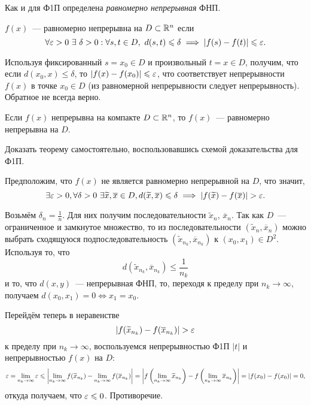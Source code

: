 \documentclass[../../main.tex]{subfiles}
\begin{document}
	Как и для Ф1П определена \emph{равномерно непрерывная} ФНП.
	\begin{defn}
		$f(x)$~--- равномерно непрерывна на $D \subset \mathbb{R}^n$ если 
		\[
			\forall \eps > 0 \ \exists \ \delta > 0 : \forall s, t \in D,\ 
			d(s, t) \leq \delta \implies |f(s) - f(t)| \leq \eps.
		\]
	\end{defn}
	
	Используя фиксированный $s = x_0 \in D$ и произвольный $t = x \in D$, 
	получим, что если $d(x_0, x) \leq \delta$, то $|f(x) - f(x_0)| \leqslant \varepsilon$,
	что соответствует непрерывности $f(x)$ в точке $x_0 \in D$ (из равномерной 
	непрерывности следует непрерывность). Обратное не всегда верно.
	
	\begin{thm}[Кантор]
		Если $f(x)$ непрерывна на компакте $D \subset \mathbb{R}^n$, то $f(x)$~---
		равномерно непрерывна на $D$.
	\end{thm} 
	
	\begin{exc}
		Доказать теорему самостоятельно, воспользовавшись 
		схемой доказательства для Ф1П.
	\end{exc}
	\begin{eans}
		Предположим, что $f(x)$ не является равномерно непрерывной на $D$, что 
		значит,
		\[\exists \varepsilon > 0, \forall \delta > 0\ \exists \widetilde{x}, 
		\overline{x}\in D, d(\widetilde{x}, \overline{x})\leqslant \delta \implies 
		\left|{f(\widetilde{x}) - f(\overline{x})}\right| > \varepsilon.\]
		
		Возьмём $\delta_n = \frac{1}{n}$. Для них получим последовательности 
		$\widetilde{x}_n$, $\overline{x}_n$. Так как $D$~--- ограниченное и 
		замкнутое множество, то из последовательности $\left(\widetilde{x}_n, 
		\overline{x}_n\right)$ можно выбрать 
		сходящуюся подпоследовательность $\left(\widetilde{x}_{n_k}, 
		\overline{x}_{n_k}\right)$ к $(x_0, x_1)\in D^2$. Используя то, что
		\[d(\widetilde{x}_{n_k}, \overline{x}_{n_k})\leq\frac{1}{n_k}\]
		и то, что $d(x, y)$~--- непрерывная ФНП, то, переходя к пределу при 
		$n_k\to\infty$, получаем $d(x_0, x_1) = 0 \iff x_1 = x_0$.
		
		Перейдём теперь в неравенстве
		\[\left|{f(\widetilde{x}_{n_k}) - f(\overline{x}_{n_k})}\right| > \varepsilon\]
		к пределу при $n_k\to\infty$, воспользуемся непрерывностью Ф1П $|t|$ и 
		непрерывностью $f(x)$ на $D$:
		\[\varepsilon = \lim_{n_k\to\infty}\varepsilon \leqslant
		\left|{\lim_{n_k\to\infty}f(\widetilde{x}_{n_k}) - 
		\lim_{n_k\to\infty}f(\overline{x}_{n_k})}\right| = 
		\left|{f\left(\lim_{n_k\to\infty}\widetilde{x}_{n_k}\right) - 
		f\left(\lim_{n_k\to\infty}\overline{x}_{n_k}\right)}\right| = \left|{f(x_0) - f(x_0)}\right| 
		= 0,\]
		откуда получаем, что $\varepsilon \leqslant 0$. Противоречие.
	\end{eans}
\end{document}
